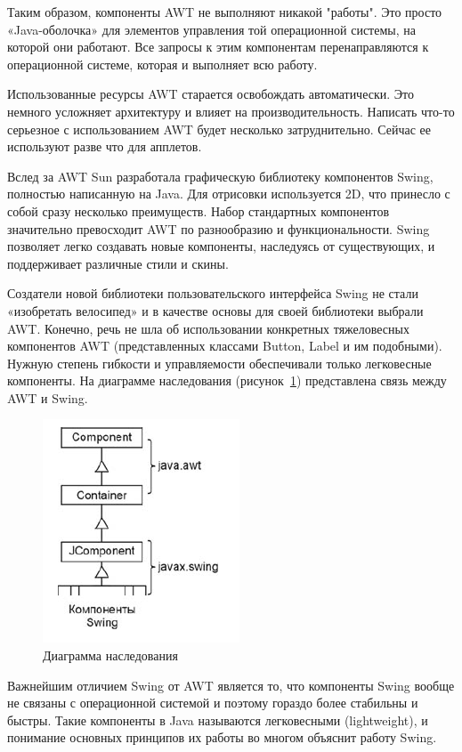 Таким образом, компоненты AWT не выполняют никакой "работы". Это просто «Java-оболочка» для элементов управления той операционной системы, на которой они работают. Все запросы к этим компонентам перенаправляются к операционной системе, которая и выполняет всю работу.

Использованные ресурсы AWT старается освобождать автоматически. Это немного усложняет архитектуру и влияет на производительность. Написать что-то серьезное с использованием AWT будет несколько затруднительно. Сейчас ее используют разве что для апплетов.

Вслед за AWT Sun разработала графическую библиотеку компонентов Swing, полностью написанную на Java. Для отрисовки используется 2D, что принесло с собой сразу несколько преимуществ. Набор стандартных компонентов значительно превосходит AWT по разнообразию и функциональности. Swing позволяет легко создавать новые компоненты, наследуясь от существующих, и поддерживает различные стили и скины.

Создатели новой библиотеки пользовательского интерфейса Swing не стали «изобретать велосипед» и в качестве основы для своей библиотеки выбрали AWT. Конечно, речь не шла об использовании конкретных тяжеловесных компонентов AWT (представленных классами Button, Label и им подобными). Нужную степень гибкости и управляемости обеспечивали только легковесные компоненты. На диаграмме наследования (рисунок~\ref{fig:swing-base}) представлена связь между AWT и Swing.

\begin{figure}[H]
	\centering
	\includegraphics[width=0.5\linewidth]{pics/swing-base}
	\caption{Диаграмма наследования}
	\label{fig:swing-base}
\end{figure}



Важнейшим отличием Swing от AWT является то, что компоненты Swing вообще не связаны с операционной системой и поэтому гораздо более стабильны и быстры. Такие компоненты в Java называются легковесными (lightweight), и понимание основных принципов их работы во многом объяснит работу Swing.

